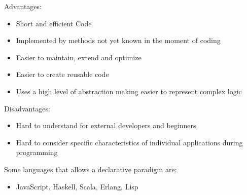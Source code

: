 Advantages:
\begin{itemize}[noitemsep]
    \item Short and efficient Code
    \item Implemented by methods not yet known in the moment of coding
    \item Easier to maintain, extend and optimize
    \item Easier to create reusable code
    \item Uses a high level of abstraction making easier to represent complex logic
\end{itemize}

Disadvantages:
\begin{itemize}[noitemsep]
    \item Hard to understand for external developers and beginners
    \item Hard to consider specific characteristics of individual applications during programming
\end{itemize}

Some languages that allows a declarative paradigm are:
\begin{itemize}
    \item JavaScript, Haskell, Scala, Erlang, Lisp
\end{itemize}




 

